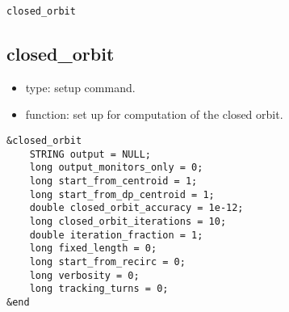 \documentclass[11pt]{article}
\begin{document}
\newpage
\begin{center}{\Large\verb|closed_orbit|}\end{center}
\subsection{closed\_orbit \label{subsec:closedorbit}}

\begin{itemize}
\item type: setup command.
\item function: set up for computation of the closed orbit.
\end{itemize}

\begin{verbatim}
&closed_orbit
    STRING output = NULL;
    long output_monitors_only = 0;
    long start_from_centroid = 1;
    long start_from_dp_centroid = 1;
    double closed_orbit_accuracy = 1e-12;
    long closed_orbit_iterations = 10;
    double iteration_fraction = 1;
    long fixed_length = 0;
    long start_from_recirc = 0;
    long verbosity = 0;
    long tracking_turns = 0;
&end
\end{verbatim}
\end{document}
